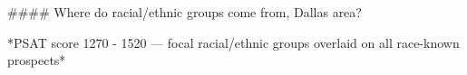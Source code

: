 #### Where do racial/ethnic groups come from, Dallas area?

*PSAT score 1270 - 1520 — focal racial/ethnic groups overlaid on all race-known prospects*
